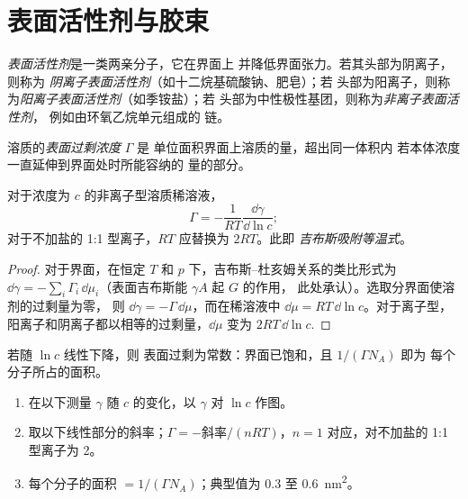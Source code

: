 \section{表面活性剂与胶束}

\begin{definition}[表面活性剂]\label{def:b3:colloids:surfactant}
\emph{表面活性剂}是一类两亲分子，它在界面上
并降低界面张力。若其头部为阴离子，则称为
\emph{阴离子表面活性剂}（如十二烷基硫酸钠、肥皂）；若
头部为阳离子，则称为\emph{阳离子表面活性剂}（如季铵盐）；若
头部为中性极性基团，则称为\emph{非离子表面活性剂}，
例如由环氧乙烷单元组成的
链。
\end{definition}

\begin{definition}[表面过剩浓度]\label{def:b3:colloids:surface-excess}
溶质的\emph{表面过剩浓度} $\Gamma$ 是
单位面积界面上溶质的量，超出同一体积内
若本体浓度一直延伸到界面处时所能容纳的
量的部分。
\end{definition}

\begin{theorem}[吉布斯吸附等温式]\label{thm:b3:colloids:gibbs-adsorption}
对于浓度为 $c$ 的非离子型溶质稀溶液，
\[
  \Gamma = -\frac{1}{RT}\frac{\dd\gamma}{\dd\ln c};
\]
对于不加盐的 1:1 型离子，$RT$ 应替换为 $2RT$。此即
\emph{吉布斯吸附等温式}。
\end{theorem}

\begin{proof}
对于界面，在恒定 $T$ 和
$p$ 下，吉布斯–杜亥姆关系的类比形式为 $\dd\gamma = -\sum_i\Gamma_i\,\dd\mu_i$（表面吉布斯能 $\gamma A$ 起 $G$ 的作用，
此处承认）。选取分界面使溶剂的过剩量为零，
则 $\dd\gamma = -\Gamma\,\dd\mu$，而在稀溶液中 $\dd\mu = RT\,\dd\ln c$。对于离子型，
阳离子和阴离子都以相等的过剩量，$\dd\mu$ 变为
$2RT\,\dd\ln c$.
\end{proof}

若随 $\ln c$ 线性下降，则
表面过剩为常数：界面已饱和，且 $1/(\Gamma N_A)$ 即为
每个分子所占的面积。

\begin{method}\label{met:b3:colloids:surface-excess}
\begin{enumerate}
  \item 在以下测量 $\gamma$ 随 $c$ 的变化，以 $\gamma$ 对 $\ln c$ 作图。
  \item 取以下线性部分的斜率；$\Gamma = -\text{斜率}/(nRT)$，$n
        = 1$ 对应，对不加盐的 1:1 型离子为 2。
  \item 每个分子的面积 $= 1/(\Gamma N_A)$；典型值为 0.3 至 \qty{0.6}{nm^2}。
\end{enumerate}
\end{method}

